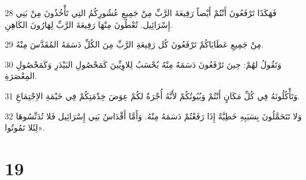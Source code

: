 \par 28 فَهَكَذَا تَرْفَعُونَ أَنْتُمْ أَيْضاً رَفِيعَةَ الرَّبِّ مِنْ جَمِيعِ عُشُورِكُمُ التِي تَأْخُذُونَ مِنْ بَنِي إِسْرَائِيل. تُعْطُونَ مِنْهَا رَفِيعَةَ الرَّبِّ لِهَارُونَ الكَاهِنِ.
\par 29 مِنْ جَمِيعِ عَطَايَاكُمْ تَرْفَعُونَ كُل رَفِيعَةِ الرَّبِّ مِنَ الكُلِّ دَسَمَهُ المُقَدَّسَ مِنْهُ.
\par 30 وَتَقُولُ لهُمْ: حِينَ تَرْفَعُونَ دَسَمَهُ مِنْهُ يُحْسَبُ لِلاوِيِّينَ كَمَحْصُولِ البَيْدَرِ وَكَمَحْصُولِ المِعْصَرَةِ.
\par 31 وَتَأْكُلُونَهُ فِي كُلِّ مَكَانٍ أَنْتُمْ وَبُيُوتُكُمْ لأَنَّهُ أُجْرَةٌ لكُمْ عِوَضَ خِدْمَتِكُمْ فِي خَيْمَةِ الاِجْتِمَاعِ.
\par 32 وَلا تَتَحَمَّلُونَ بِسَبَبِهِ خَطِيَّةً إِذَا رَفَعْتُمْ دَسَمَهُ مِنْهُ. وَأَمَّا أَقْدَاسُ بَنِي إِسْرَائِيل فَلا تُدَنِّسُوهَا لِئَلا تَمُوتُوا».

\chapter{19}

